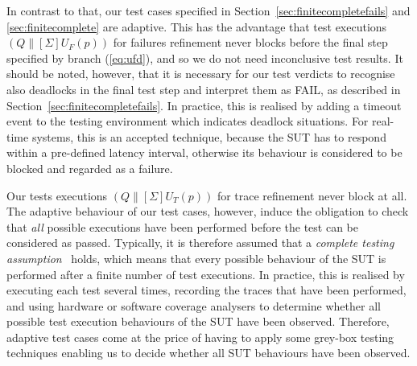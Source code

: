 In contrast to that, our test cases specified in
Section~\ref{sec:finitecompletefails} and \ref{sec:finitecomplete} are
adaptive. This has the advantage that test executions $(Q\parallel[\Sigma]
U_F(p))$ for failures refinement never blocks before the final step specified
by branch (\ref{eq:ufd}), and so we do not need inconclusive test results. It
should be noted, however, that it is necessary for our test verdicts to
recognise also deadlocks in the final test step and interpret them as FAIL,
as described in Section~\ref{sec:finitecompletefails}. In practice, this is
realised by adding a timeout event to the testing environment which indicates
deadlock situations. For real-time systems, this is an accepted technique,
because the SUT has to respond within a pre-defined latency interval,
otherwise its behaviour is considered to be blocked and regarded as a
failure. 

Our tests executions $(Q\parallel[\Sigma] U_T(p))$ for trace refinement never
block at all. The adaptive behaviour of our test cases, however, induce the
obligation to check that {\it all} possible executions have been performed
before the test can be considered as passed. Typically, it is therefore
assumed that a \emph{complete testing assumption}~\cite{hierons_testing_2004}
holds, which means that every possible behaviour of the SUT is performed
after a finite number of test executions. In practice, this is realised by
executing each test several times, recording the traces that have been
performed, and using hardware or software coverage analysers to determine
whether all possible test execution behaviours of the SUT have been observed.
Therefore, adaptive test cases come at the price of having to apply some
grey-box testing techniques enabling us to decide whether all SUT behaviours
have been observed.

